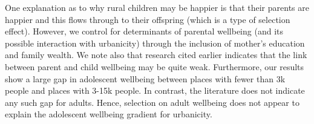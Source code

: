 \documentclass[10pt, letterpaper]{article}
\begin{document}
\begin{spacing}{1.4}

One explanation as to why rural children may be happier is that their parents are
happier and this flows through to their offspring (which is a type of  selection
effect). 
 However, we control for determinants of parental wellbeing (and its possible
interaction with urbanicity) through the inclusion of mother's education and
family wealth. We note also that research cited earlier indicates that the link
between parent and child wellbeing may be quite weak. Furthermore, our results show a large gap in adolescent wellbeing between places with fewer than 3k
people and places with 3-15k people.
 In contrast, the literature does not indicate any such gap for adults. Hence,
selection on adult wellbeing does not appear to explain the adolescent wellbeing gradient for
urbanicity.


\end{spacing}
\end{document}
